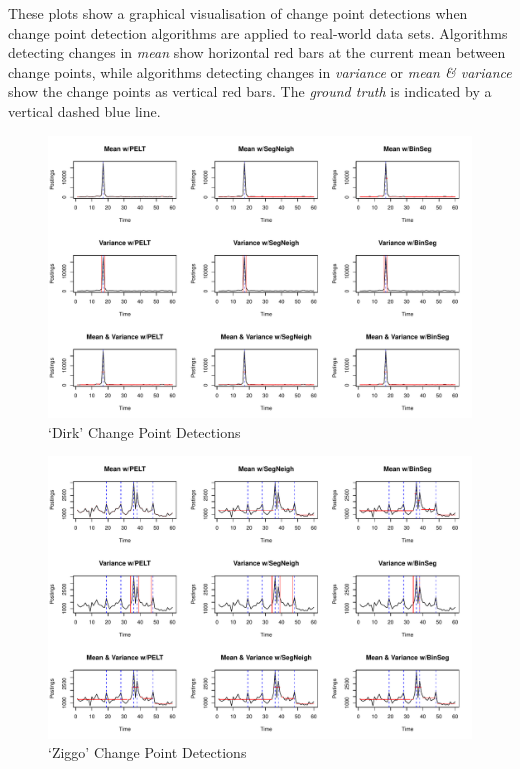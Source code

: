 \documentclass[../main.tex]{subfiles}
\begin{document}
These plots show a graphical visualisation of change point detections when change point detection algorithms are applied to real-world data sets. Algorithms detecting changes in \emph{mean} show horizontal red bars at the current mean between change points, while algorithms detecting changes in \emph{variance} or \emph{mean \& variance} show the change points as vertical red bars. The \emph{ground truth} is indicated by a vertical dashed blue line.

\begin{figure}[h]
    \includegraphics[width=\textwidth]{figures/dirkresults}
    \caption{`Dirk' Change Point Detections}
    \label{fig:dirk}
\end{figure}

\begin{figure}[h]
    \includegraphics[width=\textwidth]{figures/ziggoresults}
    \caption{`Ziggo' Change Point Detections}
    \label{fig:ziggo}
\end{figure}
\end{document}
